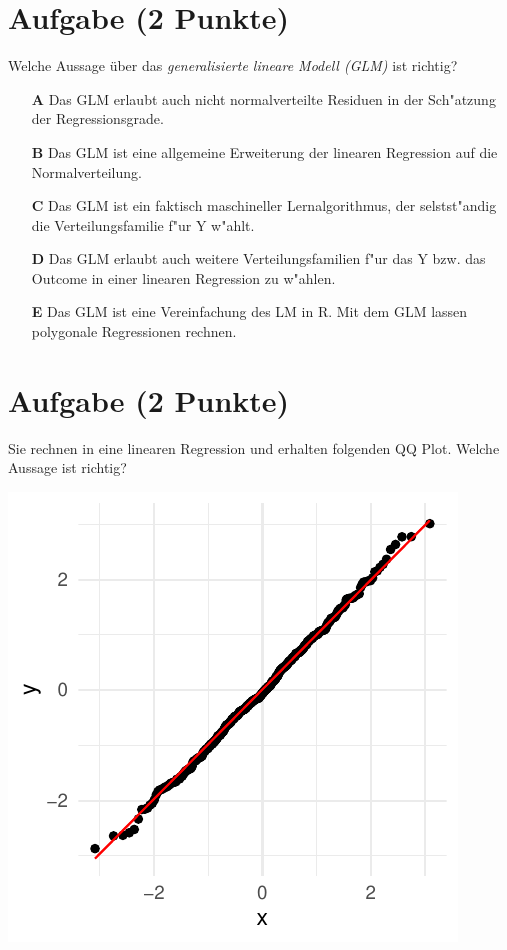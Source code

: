 \documentclass[a4paper, 10pt]{scrartcl}\usepackage[]{graphicx}\usepackage[]{xcolor}
\makeatletter
\def\maxwidth{ %
  \ifdim\Gin@nat@width>\linewidth
    \linewidth
  \else
    \Gin@nat@width
  \fi
}
\makeatother
\begin{document}
\section{Aufgabe \hfill (2 Punkte)}

Welche Aussage {\"u}ber das \textit{generalisierte lineare Modell (GLM)} ist richtig?  



\begin{enumerate}
\item [\textbf{A} \msquare] Das GLM erlaubt auch nicht normalverteilte Residuen in der Sch{"a}tzung der Regressionsgrade.
\item [\textbf{B} \msquare] Das GLM ist eine allgemeine Erweiterung der linearen Regression auf die Normalverteilung.
\item [\textbf{C} \msquare] Das GLM ist ein faktisch maschineller Lernalgorithmus, der selstst{"a}ndig die Verteilungsfamilie f{"u}r Y w{"a}hlt.
\item [\textbf{D} \msquare] Das GLM erlaubt auch weitere Verteilungsfamilien f{"u}r das Y bzw. das Outcome in einer linearen Regression zu w{"a}hlen.
\item [\textbf{E} \msquare] Das GLM ist eine Vereinfachung des LM in R. Mit dem GLM lassen polygonale Regressionen rechnen.
\end{enumerate}

\section{Aufgabe \hfill (2 Punkte)}

Sie rechnen in eine linearen Regression und erhalten folgenden QQ
Plot. Welche Aussage ist richtig?




{\centering \includegraphics[width=\maxwidth]{img/mc-regression-05-a-1} 

}
\end{document}
